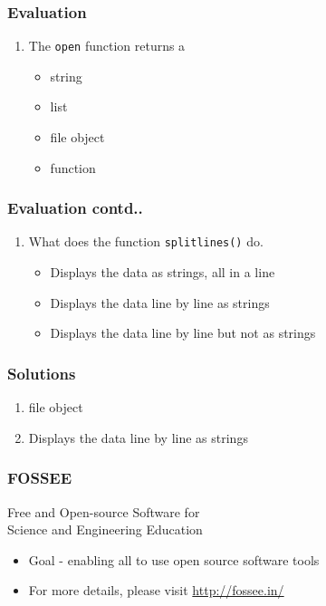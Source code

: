 \documentclass[17pt,compress]{beamer}
\newcounter{saveenumi}
\newcommand{\seti}{\setcounter{saveenumi}{\value{enumi}}}
\newcommand{\conti}{\setcounter{enumi}{\value{saveenumi}}}
\begin{document}
\begin{frame}
\frametitle{Evaluation}
\label{sec-7.1}
\begin{enumerate}
\item The \texttt{open} function returns a\pause
\begin{itemize}
\item string
\item list
\item file object
\item function
\end{itemize}
\seti
\end{enumerate}
\end{frame}
\begin{frame}
\frametitle{Evaluation contd..}
\label{sec-7.2}
\begin{enumerate}
\conti
\item What does the function \texttt{splitlines()} do.\pause
\begin{itemize}
\item Displays the data as strings, all in a line\pause
\item Displays the data line by line as strings\pause
\item Displays the data line by line but not as strings
\end{itemize}
\end{enumerate}
\end{frame}
\begin{frame}
\frametitle{Solutions}
\label{sec-8}
\begin{enumerate}
\item file object\pause
\vspace{10pt}
\item Displays the data line by line as strings
\end{enumerate}
\end{frame}
\begin{frame}
\frametitle{FOSSEE}
{\color{blue}Free and Open-source Software for \\Science and Engineering Education} \\
\begin{itemize}
\item Goal - enabling all to use open source software tools
\item For more details, please visit {\color{blue}\url{http://fossee.in/}}
\end{itemize}
\end{frame}
\end{document}

